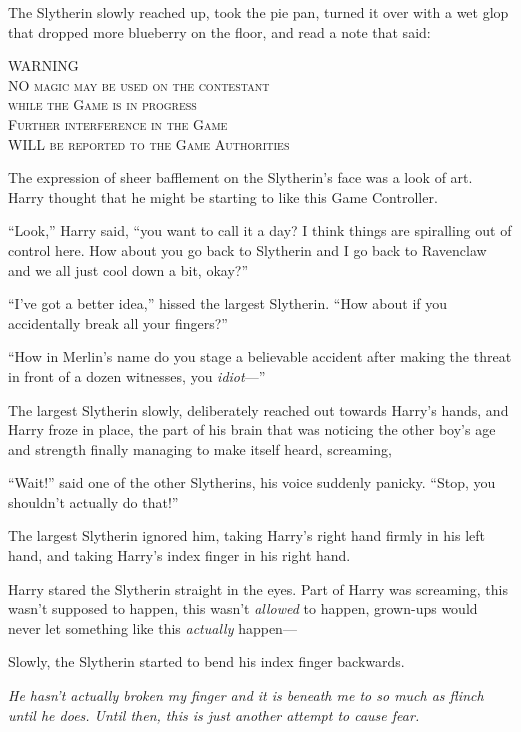 The Slytherin slowly reached up, took the pie pan, turned it over with a wet glop that dropped more blueberry on the floor, and read a note that said:
\begin{center}
\scshape \MakeUppercase{Warning}\\
\MakeUppercase{No} magic may be used on the contestant\\
while the Game is in progress\\
Further interference in the Game\\
\MakeUppercase{will} be reported to the Game Authorities
\end{center}

The expression of sheer bafflement on the Slytherin’s face was a look of art. Harry thought that he might be starting to like this Game Controller.

“Look,” Harry said, “you want to call it a day? I think things are spiralling out of control here. How about you go back to Slytherin and I go back to Ravenclaw and we all just cool down a bit, okay?”

“I’ve got a better idea,” hissed the largest Slytherin. “How about if you accidentally break all your fingers?”

“How in Merlin’s name do you stage a believable accident after making the threat in front of a dozen witnesses, you \emph{idiot}—”

The largest Slytherin slowly, deliberately reached out towards Harry’s hands, and Harry froze in place, the part of his brain that was noticing the other boy’s age and strength finally managing to make itself heard, screaming, 

“Wait!” said one of the other Slytherins, his voice suddenly panicky. “Stop, you shouldn’t actually do that!”

The largest Slytherin ignored him, taking Harry’s right hand firmly in his left hand, and taking Harry’s index finger in his right hand.

Harry stared the Slytherin straight in the eyes. Part of Harry was screaming, this wasn’t supposed to happen, this wasn’t \emph{allowed} to happen, grown-ups would never let something like this \emph{actually} happen—

Slowly, the Slytherin started to bend his index finger backwards.

\emph{He hasn’t actually broken my finger and it is beneath me to so much as flinch until he does. Until then, this is just another attempt to cause fear.}


